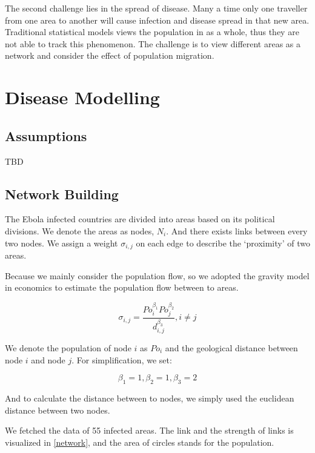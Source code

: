 \documentclass[12pt]{article}
\begin{document}
The second challenge lies in the spread of disease. Many a time only one traveller from one area to another will cause infection and disease spread in that new area. Traditional statistical models views the population in as a whole, thus they are not able to track this phenomenon. The challenge is to view different areas as a network and consider the effect of population migration.


\section{Disease Modelling}

\subsection{Assumptions}

TBD

\subsection{Network Building}

The Ebola infected countries are divided into areas based on its
 political divisions. We denote the areas as nodes, $N_i$. And there exists links between every two nodes. We assign a weight $\sigma_{i,j}$ on each edge to describe the `proximity' of two areas. 
 
Because we mainly consider the population flow, so we adopted the gravity model\cite{anderson2010gravity}\cite{karemera2000gravity} in economics to estimate the population flow between to areas.

$$\sigma_{i,j} = \frac{Po_i^{\beta_1}Po_j^{\beta_2}}{d_{i,j}^{\beta_3}}, i \neq j$$

We denote the population of node $i$ as $Po_i$ and the geological distance between node $i$ and node $j$. For simplification, we set:

$$\beta_1 = 1, \beta_2 = 1, \beta_3 = 2$$

And to calculate the distance between to nodes, we simply used the euclidean distance between two nodes.

We fetched the data of 55 infected areas. The link and the strength of links is visualized in \ref{network}, and the area of circles stands for the population.
\end{document}
